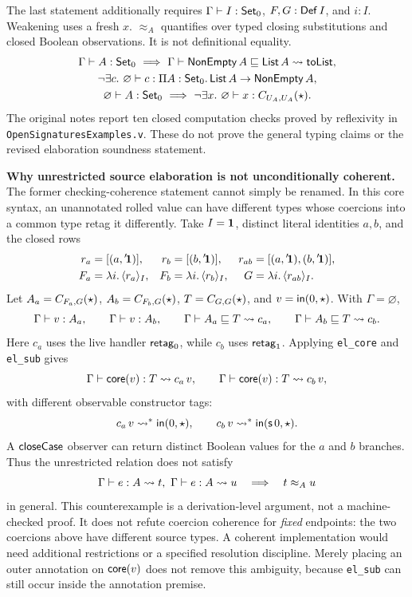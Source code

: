 The last statement additionally requires
$\Gamma\vdash I:\mathsf{Set}_0$, $F,G:\mathsf{Def}\,I$, and $i:I$.
Weakening uses a fresh $x$.
$\approx_A$ quantifies over typed closing substitutions and closed Boolean
observations. It is not definitional equality.
\[
\begin{gathered}
 \Gamma\vdash A:\mathsf{Set}_0
 \ \Longrightarrow\
 \Gamma\vdash \mathsf{NonEmpty}\,A\sqsubseteq \mathsf{List}\,A\rightsquigarrow \mathsf{toList},\\
 \neg\exists c.\ \varnothing\vdash c:
       \Pi A:\mathsf{Set}_0.\,\mathsf{List}\,A\to\mathsf{NonEmpty}\,A,\\
 \varnothing\vdash A:\mathsf{Set}_0
 \ \Longrightarrow\
 \neg\exists x.\ \varnothing\vdash x:C_{U_A,U_A}(\star).
\end{gathered}
\]
The original notes report ten closed computation checks proved by
reflexivity in \texttt{OpenSignaturesExamples.v}. These do not prove the
general typing claims or the revised elaboration soundness statement.

\newpage
\textbf{Why unrestricted source elaboration is not unconditionally coherent.}
The former checking-coherence statement cannot simply be renamed. In this
core syntax, an unannotated rolled value can have different types whose
coercions into a common type retag it differently.
Take $I=\mathbf{1}$, distinct literal identities $a,b$, and the closed rows
\[
\begin{aligned}
 r_a&=[(a,{}^{\prime}\!\mathbf{1})],&
 r_b&=[(b,{}^{\prime}\!\mathbf{1})],&
 r_{ab}&=[(a,{}^{\prime}\!\mathbf{1}),(b,{}^{\prime}\!\mathbf{1})],\\
 F_a&=\lambda i.\,\langle r_a\rangle_I,&
 F_b&=\lambda i.\,\langle r_b\rangle_I,&
 G&=\lambda i.\,\langle r_{ab}\rangle_I.
\end{aligned}
\]
Let $A_a=C_{F_a,G}(\star)$, $A_b=C_{F_b,G}(\star)$,
$T=C_{G,G}(\star)$, and $v=\mathsf{in}(0,\star)$. With $\Gamma=\varnothing$,
\[
 \Gamma\vdash v:A_a,\qquad \Gamma\vdash v:A_b,\qquad
 \Gamma\vdash A_a\sqsubseteq T\rightsquigarrow c_a,\qquad \Gamma\vdash A_b\sqsubseteq T\rightsquigarrow c_b.
\]
Here $c_a$ uses the live handler $\mathsf{retag}_0$, while $c_b$ uses
$\mathsf{retag}_1$. Applying \texttt{el\_core} and \texttt{el\_sub} gives
\[
 \Gamma\vdash \mathsf{core}(v):T\rightsquigarrow c_a\,v,\qquad
 \Gamma\vdash \mathsf{core}(v):T\rightsquigarrow c_b\,v,
\]
with different observable constructor tags:
\[
 c_a\,v\leadsto^*\mathsf{in}(0,\star),\qquad
 c_b\,v\leadsto^*\mathsf{in}(\mathsf{s}\,0,\star).
\]
A $\mathsf{closeCase}$ observer can return distinct Boolean values for the
$a$ and $b$ branches. Thus the unrestricted relation does not satisfy
\[
 \Gamma\vdash e:A\rightsquigarrow t,\ \Gamma\vdash e:A\rightsquigarrow u
 \quad\Longrightarrow\quad t\approx_A u
\]
in general. This counterexample is a derivation-level argument, not a
machine-checked proof. It does not refute coercion coherence for \emph{fixed}
endpoints: the two coercions above have different source types.
A coherent implementation would need additional restrictions or a specified
resolution discipline. Merely placing an outer annotation on
$\mathsf{core}(v)$ does not remove this ambiguity, because \texttt{el\_sub} can
still occur inside the annotation premise.

